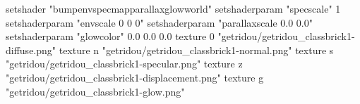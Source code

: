 setshader "bumpenvspecmapparallaxglowworld"
setshaderparam "specscale" 1
setshaderparam "envscale 0 0 0"
setshaderparam "parallaxscale 0.0 0.0"
setshaderparam "glowcolor" 0.0 0.0 0.0
texture 0 "getridou/getridou_classbrick1-diffuse.png"
texture n "getridou/getridou_classbrick1-normal.png"
texture s "getridou/getridou_classbrick1-specular.png"
texture z "getridou/getridou_classbrick1-displacement.png"
texture g "getridou/getridou_classbrick1-glow.png"
